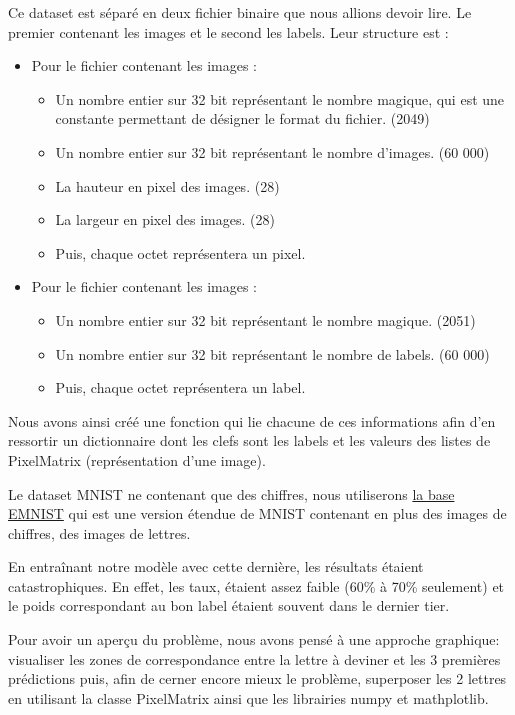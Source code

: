 \documentclass[a4paper, 12pt]{article}
\begin{document}
Ce dataset est séparé en deux fichier binaire que nous allions devoir lire. Le premier contenant les images et le second les labels. Leur structure est :
\begin{itemize}
	\item Pour le fichier contenant les images :
	\begin{itemize}
		\item Un nombre entier sur 32 bit représentant le nombre magique, qui est une constante permettant de désigner le format du fichier. (2049)
		\item Un nombre entier sur 32 bit représentant le nombre d'images. (60 000)
		\item La hauteur en pixel des images. (28)
		\item La largeur en pixel des images. (28)
		\item Puis, chaque octet représentera un pixel.
	\end{itemize}
	\item Pour le fichier contenant les images :
	\begin{itemize}
		\item Un nombre entier sur 32 bit représentant le nombre magique. (2051)
		\item Un nombre entier sur 32 bit représentant le nombre de labels. (60 000)
		\item Puis, chaque octet représentera un label.
	\end{itemize}
\end{itemize}

Nous avons ainsi créé une fonction qui lie chacune de ces informations afin d'en ressortir un dictionnaire dont les clefs sont les labels et les valeurs des listes de PixelMatrix (représentation d'une image).

Le dataset MNIST ne contenant que des chiffres, nous utiliserons  \href{https://www.nist.gov/itl/iad/image-group/emnist-dataset}{la base EMNIST} qui est une version étendue de MNIST contenant en plus des images de chiffres, des images de lettres.

En entraînant notre modèle avec cette dernière, les résultats étaient catastrophiques. En effet, les taux, étaient assez faible (60\% à 70\% seulement) et le poids correspondant au bon label étaient souvent dans le dernier tier.

Pour avoir un aperçu du problème, nous avons pensé à une approche graphique: visualiser les zones de correspondance entre la lettre à deviner et les 3 premières prédictions puis, afin de cerner encore mieux le problème, superposer les 2 lettres en utilisant la classe PixelMatrix ainsi que les librairies numpy et mathplotlib.
\end{document}
